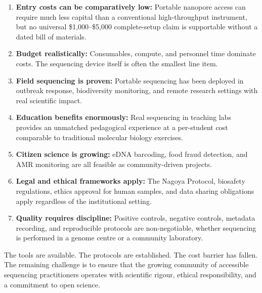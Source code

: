 \begin{enumerate}[itemsep=2pt]
  \item \textbf{Entry costs can be comparatively low:} Portable nanopore access can require much less capital than a conventional high-throughput instrument, but no universal \$1,000--\$5,000 complete-setup claim is supportable without a dated bill of materials.
  \item \textbf{Budget realistically:} Consumables, compute, and personnel time dominate costs. The sequencing device itself is often the smallest line item.
  \item \textbf{Field sequencing is proven:} Portable sequencing has been deployed in outbreak response, biodiversity monitoring, and remote research settings with real scientific impact.
  \item \textbf{Education benefits enormously:} Real sequencing in teaching labs provides an unmatched pedagogical experience at a per-student cost comparable to traditional molecular biology exercises.
  \item \textbf{Citizen science is growing:} eDNA barcoding, food fraud detection, and \acrshort{AMR} monitoring are all feasible as community-driven projects.
  \item \textbf{Legal and ethical frameworks apply:} The Nagoya Protocol, biosafety regulations, ethics approval for human samples, and data sharing obligations apply regardless of the institutional setting.
  \item \textbf{Quality requires discipline:} Positive controls, negative controls, metadata recording, and reproducible protocols are non-negotiable, whether sequencing is performed in a genome centre or a community laboratory.
\end{enumerate}

The tools are available. The protocols are established. The cost barrier has fallen. The remaining challenge is to ensure that the growing community of accessible sequencing practitioners operates with scientific rigour, ethical responsibility, and a commitment to open science.
